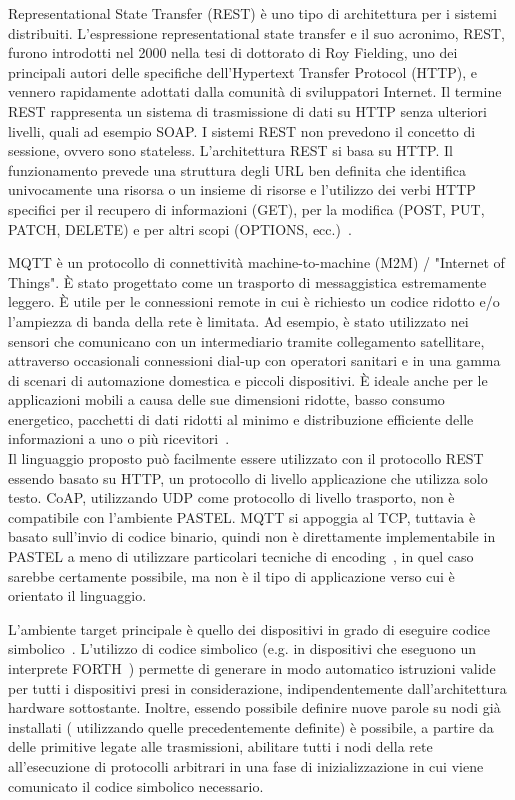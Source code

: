 \documentclass[10pt]{article}
\begin{document}
Representational State Transfer (REST) è uno tipo di architettura per i sistemi distribuiti. L'espressione representational state transfer e il suo acronimo, REST, furono introdotti nel 2000 nella tesi di dottorato di Roy Fielding, uno dei principali autori delle specifiche dell'Hypertext Transfer Protocol (HTTP), e vennero rapidamente adottati dalla comunità di sviluppatori Internet.
Il termine REST rappresenta un sistema di trasmissione di dati su HTTP senza ulteriori livelli, quali ad esempio SOAP. I sistemi REST non prevedono il concetto di sessione, ovvero sono stateless.
L'architettura REST si basa su HTTP. Il funzionamento prevede una struttura degli URL ben definita che identifica univocamente una risorsa o un insieme di risorse e l'utilizzo dei verbi HTTP specifici per il recupero di informazioni (GET), per la modifica (POST, PUT, PATCH, DELETE) e per altri scopi (OPTIONS, ecc.)~\cite{fielding2000architectural}.

MQTT è un protocollo di connettività machine-to-machine (M2M) / "Internet of Things". È stato progettato come un trasporto di messaggistica estremamente leggero. È utile per le connessioni  remote in cui è richiesto un codice ridotto e/o l'ampiezza di banda della rete è limitata. Ad esempio, è stato utilizzato nei sensori che comunicano con un intermediario tramite collegamento satellitare, attraverso occasionali connessioni dial-up con operatori sanitari e in una gamma di scenari di automazione domestica e piccoli dispositivi. È ideale anche per le applicazioni mobili a causa delle sue dimensioni ridotte, basso consumo energetico, pacchetti di dati ridotti al minimo e distribuzione efficiente delle informazioni a uno o più ricevitori~\cite{banks2019mqtt}.\\



Il linguaggio proposto può facilmente essere utilizzato con il protocollo REST essendo basato su HTTP, un protocollo di livello applicazione che utilizza solo testo. CoAP, utilizzando UDP come protocollo di livello trasporto, non è compatibile con l'ambiente PASTEL. MQTT si appoggia al TCP, tuttavia è basato sull'invio di codice binario, quindi non è direttamente implementabile in PASTEL a meno di utilizzare particolari tecniche di encoding~\cite{josefsson2006base16}, in quel caso sarebbe certamente possibile, ma non è il tipo di applicazione verso cui è orientato il linguaggio.

L'ambiente target principale è quello dei dispositivi in grado di eseguire codice simbolico~\cite{gaglio2017dc4cd}. L'utilizzo di codice simbolico (e.g. in dispositivi che eseguono un interprete FORTH~\cite{brodie2004thinking}) permette di generare in modo automatico istruzioni valide per tutti i dispositivi presi in considerazione, indipendentemente dall'architettura hardware sottostante.
Inoltre, essendo possibile definire nuove parole su nodi già installati ( utilizzando quelle precedentemente definite) è possibile, a partire da delle primitive legate alle trasmissioni, abilitare tutti i nodi della rete all'esecuzione di protocolli arbitrari in una fase di inizializzazione in cui viene comunicato il codice simbolico necessario. 
\end{document}
